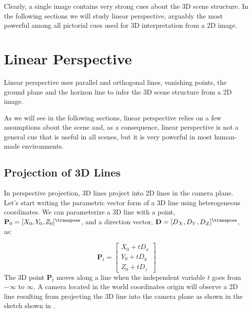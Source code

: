 Clearly, a single image contains very strong cues about the 3D scene structure. In the following sections we will study linear perspective, arguably the most powerful among all pictorial cues used for 3D interpretation from a 2D image.

\section{Linear Perspective}

Linear perspective uses parallel and orthogonal lines, vanishing points, the ground plane and the horizon line to infer the 3D scene structure from a 2D image. 

As we will see in the following sections, linear perspective relies on a few assumptions about the scene and, as a consequence, linear perspective is not a general cue that is useful in all scenes, but it is very powerful in most human-made environments. 

\subsection{Projection of 3D Lines}

In perspective projection, 3D lines project into 2D lines in the camera plane. Let's start writing the parametric vector form of a 3D line using heterogeneous coordinates. We can parameterize a 3D line with a point, $\mathbf{P}_0=[X_0, Y_0, Z_0]^\transpose$, and a direction vector, $\mathbf{D} = [D_X, D_Y, D_Z]^\transpose$, as:

\begin{equation}
\mathbf{P}_t = 
    \begin{bmatrix}
    X_0 + t D_x\\
    Y_0 + t D_y\\
    Z_0 + t D_z
    \end{bmatrix}
\label{eq:parametric_vector_line}
\end{equation}
The 3D point $\mathbf{P}_t$ moves along a line when the independent variable $t$ goes from $-\infty$ to $\infty$. A camera located in the world coordinates origin will observe a 2D line resulting from projecting the 3D line into the camera plane as shown in the sketch shown in \fig{\ref{fig:vanishing_points}}.

